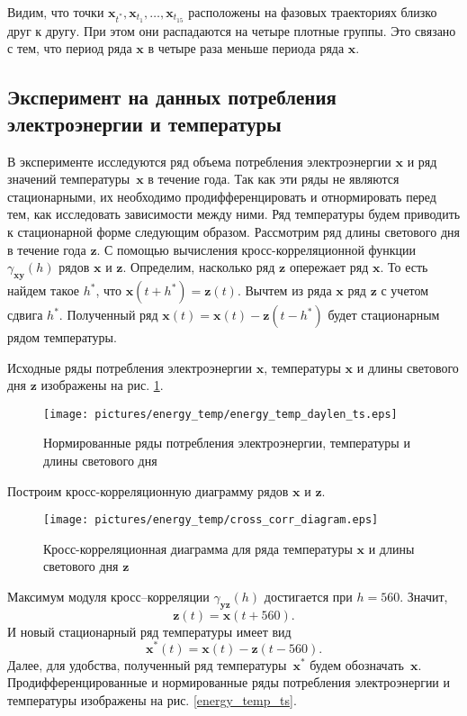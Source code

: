 \documentclass[14pt]{article}
\newcommand{\bx}{\mathbf{x}}
\newcommand{\by}{\mathbf{y}}
\newcommand{\bz}{\mathbf{z}}
\begin{document}
Видим, что точки $\bx_{t^*}, \bx_{t_1}, \ldots, \bx_{t_{15}}$ расположены на фазовых траекториях близко друг к другу. При этом они распадаются на четыре плотные группы. Это связано с тем, что период ряда $\bx$ в четыре раза меньше периода ряда $\bx$.


\subsection{Эксперимент на данных потребления электроэнергии и температуры}\label{section_energy_temp}

В эксперименте исследуются ряд объема потребления электроэнергии $\bx$ и ряд значений температуры~$\bx$ в течение года. Так как эти ряды не являются стационарными, их необходимо продифференцировать и отнормировать  перед тем, как исследовать зависимости между ними. 
Ряд температуры будем приводить к стационарной форме следующим образом. Рассмотрим ряд длины светового дня в течение года $\bz$. С помощью вычисления кросс-корреляционной функции $\gamma_{\bx\by}(h)$ рядов $\bx$ и $\bz$.  Определим, насколько ряд $\bz$ опережает ряд $\bx$. То есть найдем такое $h^*$, что $\bx(t + h^*) = \bz(t)$. Вычтем из ряда $\bx$ ряд $\bz$ с учетом сдвига $h^*$. Полученный ряд $\bx(t) = \bx(t) - \bz(t - h^*)$ будет стационарным рядом температуры. 

Исходные ряды потребления электроэнергии $\bx$, температуры $\bx$ и длины светового дня $\bz$ изображены на рис. \ref{energy_temp_day_len_ts}.

\begin{figure}[H]
\begin{center}
\texttt{[image: pictures/energy\_temp/energy\_temp\_daylen\_ts.eps]}
\end{center}
\vspace{-5mm}
\caption{Нормированные ряды потребления электроэнергии, температуры и длины светового дня}
\label{energy_temp_day_len_ts}
\end{figure}

Построим кросс-корреляционную диаграмму рядов $\bx$ и $\bz$.
\begin{figure}[H]
\begin{center}
\texttt{[image: pictures/energy\_temp/cross\_corr\_diagram.eps]}
\end{center}
\caption{Кросс-корреляционная диаграмма для ряда температуры $\bx$ и длины светового дня $\bz$}
\label{cross_corr_YZ}
\end{figure}


Максимум модуля кросс--корреляции $\gamma_{\by\bz}(h)$ достигается при $h = 560$. Значит, $$\bz(t) = \bx(t + 560).$$
И новый стационарный ряд температуры имеет вид $$\bx^*(t) = \bx(t) - \bz(t - 560).$$
Далее, для удобства, полученный ряд температуры~$\bx^*$ будем обозначать~$\bx$.
Продифференцированные и нормированные ряды потребления электроэнергии и температуры  изображены на рис. \ref{energy_temp_ts}.
\end{document}
